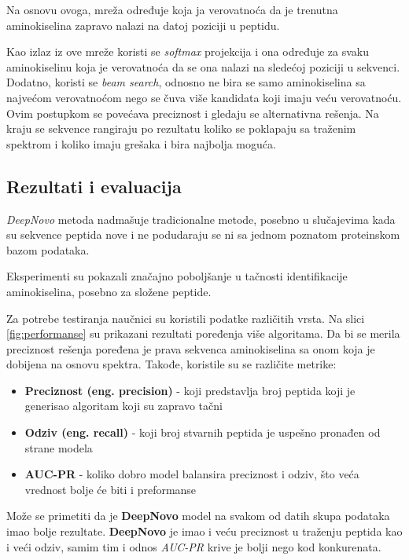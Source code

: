\documentclass[12pt,oneside]{memoir}
\begin{document}
Na osnovu ovoga, mreža određuje koja ja verovatnoća da je trenutna aminokiselina zapravo nalazi na datoj poziciji u peptidu.

Kao izlaz iz ove mreže koristi se \emph{softmax} projekcija i ona određuje za svaku aminokiselinu koja je verovatnoća da se ona nalazi na sledećoj poziciji u sekvenci. Dodatno, koristi se \emph{beam search}, odnosno ne bira se samo aminokiselina sa najvećom verovatnoćom nego se čuva više kandidata koji imaju veću verovatnoću. Ovim postupkom se povećava preciznost i gledaju se alternativna rešenja. Na kraju se sekvence rangiraju po rezultatu koliko se poklapaju sa traženim spektrom i koliko imaju grešaka i bira najbolja moguća.

\subsection{Rezultati i evaluacija}

\emph{DeepNovo} metoda nadmašuje tradicionalne metode, posebno u slučajevima kada su sekvence peptida nove i ne podudaraju se ni sa jednom poznatom proteinskom bazom podataka.

Eksperimenti su pokazali značajno poboljšanje u tačnosti identifikacije aminokiselina, posebno za složene peptide.

Za potrebe testiranja naučnici su koristili podatke različitih vrsta. Na slici \ref{fig:performanse} su prikazani rezultati poređenja više algoritama. Da bi se merila preciznost rešenja poređena je prava sekvenca aminokiselina sa onom koja je dobijena na osnovu spektra. 
Takođe, koristile su se različite metrike:
\begin{itemize}
    \item \textbf{Preciznost (eng. precision)} - koji predstavlja broj peptida koji je generisao algoritam koji su zapravo tačni
    \item \textbf{Odziv (eng. recall)} - koji broj stvarnih peptida je uspešno pronađen od strane modela
    \item \textbf{AUC-PR} - koliko dobro model balansira preciznost i odziv, što veća vrednost bolje će biti i preformanse
\end{itemize}

Može se primetiti da je \textbf{DeepNovo} model na svakom od datih skupa podataka imao bolje rezultate. \textbf{DeepNovo} je imao i veću preciznost u traženju peptida kao i veći odziv, samim tim i odnos \emph{AUC-PR} krive je bolji nego kod konkurenata.
\end{document}

